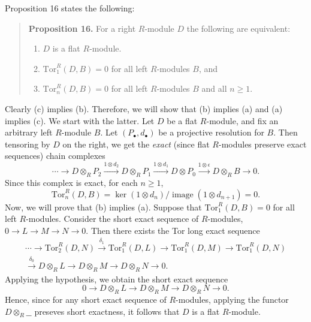 \documentclass{article}
\newcommand{\tor}{\text{Tor}}
\begin{document}
	Proposition 16 states the following:
	\begin{quote}
		\textbf{Proposition 16.} For a right $R$-module $D$ the following are equivalent: \vspace{-0.25cm}
		\begin{enumerate}[itemsep =-0.6pt,label = \textbf{(\alph{*})}]
			\item $D$ is a flat $R$-module. 
			\item $\tor_{1}^{R}(D,B) = 0$ for all left $R$-modules $B$, and 
			\item $\tor_{n}^{R}(D, B) = 0$ for all left $R$-modules $B$ and all $n \geq 1$. 
		\end{enumerate}
	\end{quote}
	Clearly (c) implies (b). Therefore, we will show that (b) implies (a) and (a) implies (c). We start with the latter. Let $D$ be a flat $R$-module, and fix an arbitrary left $R$-module $B$. Let $(P_{\bullet}, d_{\bullet})$ be a projective resolution for $B$. Then tensoring by $D$ on the right, we get the \textit{exact} (since flat $R$-modules preserve exact sequences) chain complexes 
	\begin{equation*}
		\dotsm \to D \otimes_{R} P_{2} \xrightarrow{1 \otimes d_{2}} D \otimes_{R} P_{1} \xrightarrow{1 \otimes d_{1}} D \otimes P_{0} \xrightarrow{1 \otimes \epsilon} D \otimes_{R}B \to 0. 
	\end{equation*}
	Since this complex is exact, for each $n \geq 1$,
	\begin{equation*}
		\tor_{n}^{R}(D,B) = \ker(1 \otimes d_{n})/\operatorname{image}(1 \otimes d_{n + 1}) = 0. 
	\end{equation*}
	Now, we will prove that (b) implies (a). Suppose that $\tor_{1}^{R}(D, B) = 0$ for all left $R$-modules. Consider the short exact sequence of $R$-modules, $0 \to L \to M \to N \to 0$. Then there exists the Tor long exact sequence 
	\begin{multline*}
		\dotsm \to \tor_{2}^{R}(D, N) \xrightarrow{\delta_{1}} \tor_{1}^{R}(D, L) \to \tor_{1}^{R}(D,M) \to \tor_{1}^{R}(D, N) \\ \xrightarrow{\delta_{0}} D \otimes_{R} L \to D\otimes_{R} M \to D \otimes_{R} N \to 0.
	\end{multline*}
	Applying the hypothesis, we obtain the short exact sequence 
	\begin{equation*}
		0 \to D \otimes_{R} L \to D \otimes_{R} M \to D \otimes_{R} N \to 0. 
	\end{equation*}
	Hence, since for any short exact sequence of $R$-modules, applying the functor $D \otimes_{R} \_\_$ preseves short exactness, it follows that $D$ is a flat $R$-module. 
	
\end{document}

